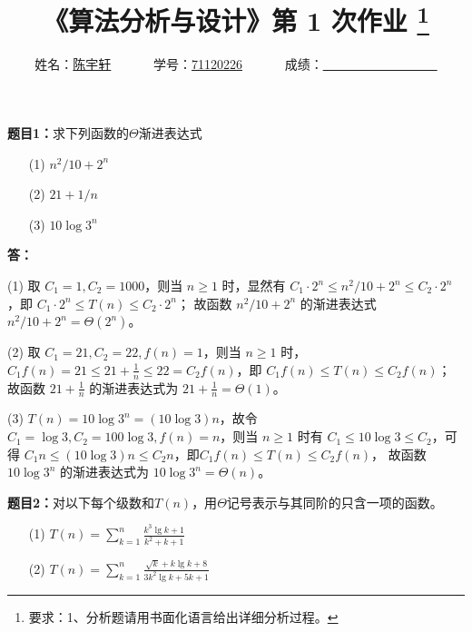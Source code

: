 \documentclass[12pt,a4paper]{ctexart}
\begin{document}

\title{
  {
    \heiti《算法分析与设计》第 {1} 次作业
    \footnote{要求：1、分析题请用书面化语言给出详细分析过程。}
  }
}
\date{}

\author{
姓名：\underline{陈宇轩}~~~~~~
学号：\underline{71120226}~~~~~~
成绩：\underline{~~~~~~~~~~~~~~~~~~}
}

\maketitle

\noindent
\section*{\bf \color{red}{算法分析题}}

\noindent
{\bf 题目1：}求下列函数的$\Theta$渐进表达式
\begin{enumerate}
  \item[(1)]  $n^2/10+2^n$
  \item[(2)]  $21+1/n$
  \item[(3)]  $10\log{}{3^n}$
\end{enumerate}

\vspace{5pt}
\noindent
{
  \textbf{答：}

  (1) 取 $C_1 = 1, C_2 = 1000$，则当 $n \geq 1$ 时，显然有 $C_1 \cdot 2^n \leq n^2/10+2^n \leq C_2 \cdot 2^n$，即 $C_1 \cdot 2^n \leq T(n) \leq C_2 \cdot 2^n$；
      故函数 $n^2/10+2^n$ 的渐进表达式 $n^2/10+2^n = \Theta(2^n)$。

  (2) 取 $C_1 = 21, C_2 = 22, f(n) = 1$，则当 $n \geq 1$ 时，$C_1f(n) = 21 \leq 21 + \frac{1}{n} \leq 22 = C_2f(n)$，即 $C_1f(n) \leq T(n) \leq C_2f(n)$；
      故函数 $21 + \frac{1}{n}$ 的渐进表达式为 $21 + \frac{1}{n} = \Theta(1)$。

  (3) $T(n) = 10 \log{3^n} = (10 \log3) n$，故令 $C_1 = \log3, C_2 = 100\log3, f(n) = n$，则当 $n \geq 1$ 时有 $C_1 \leq 10\log3 \leq C_2$，可得 $C_1n \leq (10\log3)n \leq C_2n$，即$C_1f(n) \leq T(n) \leq C_2f(n)$，
      故函数 $10\log{}{3^n}$ 的渐进表达式为 $10\log{}{3^n} = \Theta(n)$。
}


\vspace{10pt}
\noindent
{\bf 题目2：}对以下每个级数和$T(n)$，用$\Theta$记号表示与其同阶的只含一项的函数。
\begin{enumerate}
  \item[(1)]  $T(n)=\sum\limits_{k=1}^n\frac{k^3\lg k+1}{k^2+k+1}$
  \item[(2)]  $T(n)=\sum\limits_{k=1}^n\frac{\sqrt{k}+k\lg k+8}{3k^2\lg k+5k+1}$
\end{enumerate}
\end{document}
